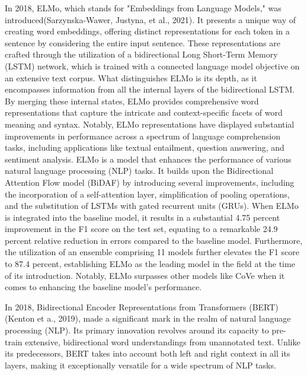 \documentclass[fleqn,10pt]{thescipub} %
\begin{document}
In 2018, ELMo, which stands for "Embeddings from Language Models," was introduced(Sarzynska-Wawer, Justyna, et al., 2021). It presents a unique way of creating word embeddings, offering distinct representations for each token in a sentence by considering the entire input sentence. These representations are crafted through the utilization of a bidirectional Long Short-Term Memory (LSTM) network, which is trained with a connected language model objective on an extensive text corpus. What distinguishes ELMo is its depth, as it encompasses information from all the internal layers of the bidirectional LSTM. By merging these internal states, ELMo provides comprehensive word representations that capture the intricate and context-specific facets of word meaning and syntax. Notably, ELMo representations have displayed substantial improvements in performance across a spectrum of language comprehension tasks, including applications like textual entailment, question answering, and sentiment analysis.
ELMo is a model that enhances the performance of various natural language processing (NLP) tasks. It builds upon the Bidirectional Attention Flow model (BiDAF) by introducing several improvements, including the incorporation of a self-attention layer, simplification of pooling operations, and the substitution of LSTMs with gated recurrent units (GRUs). When ELMo is integrated into the baseline model, it results in a substantial 4.75 percent improvement in the F1 score on the test set, equating to a remarkable 24.9 percent relative reduction in errors compared to the baseline model. Furthermore, the utilization of an ensemble comprising 11 models further elevates the F1 score to 87.4 percent, establishing ELMo as the leading model in the field at the time of its introduction. Notably, ELMo surpasses other models like CoVe when it comes to enhancing the baseline model's performance.

In 2018, Bidirectional Encoder Representations from Transformers (BERT)(Kenton et a., 2019), made a significant mark in the realm of natural language processing (NLP). Its primary innovation revolves around its capacity to pre-train extensive, bidirectional word understandings from unannotated text. Unlike its predecessors, BERT takes into account both left and right context in all its layers, making it exceptionally versatile for a wide spectrum of NLP tasks.
\end{document}
